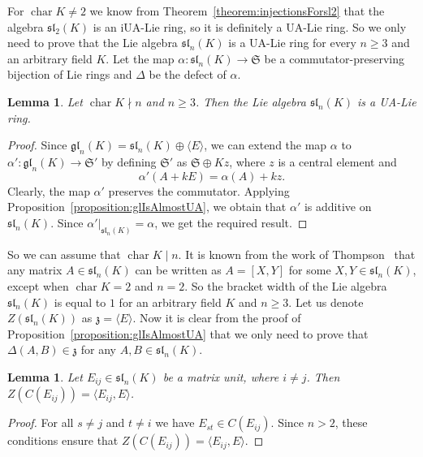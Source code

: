 \documentclass[a4paper,reqno,12pt]{amsart}
\newtheorem{lemma}[proposition]{Lemma}
\theoremstyle{definition}
\theoremstyle{remark}
\DeclareMathOperator{\Char}{char}
\def\SSS{\mathfrak{S}}
\def\zzz{\mathfrak{z}}
\def\gl{\mathfrak{gl}}
\def\sl{\mathfrak{sl}}
\renewcommand{\ge}{\geqslant}
\begin{document}
	For $\Char K \neq 2$ we know from Theorem~\ref{theorem:injectionsForsl2} that the algebra $\sl_2(K)$ is an iUA-Lie ring, so it is definitely a UA-Lie ring. So we only need to prove that the Lie algebra $\sl_n(K)$ is a UA-Lie ring for every $n \ge 3$ and an arbitrary field $K$. Let the map $\alpha : \sl_n(K) \rightarrow \SSS$ be a commutator-preserving bijection of Lie rings and $\Delta$ be the defect of $\alpha$.

	\begin{lemma}\label{lemma:slIsUAwhenCharNDevideN}
		Let $\Char K \nmid n$ and $n \ge 3$. Then the Lie algebra $\sl_n(K)$ is a UA-Lie ring.
	\end{lemma}

	\begin{proof}
		Since $\gl_n(K) = \sl_n(K) \oplus \langle E \rangle$, we can extend the map $\alpha$ to $\alpha' : \gl_n(K) \rightarrow \SSS'$ by defining $\SSS'$ as $\SSS \oplus Kz$, where $z$ is a central element and
		\begin{equation*}
			\alpha'(A + kE) = \alpha(A) + kz.
		\end{equation*}
		Clearly, the map $\alpha'$ preserves the commutator. Applying Proposition~\ref{proposition:glIsAlmostUA}, we obtain that $\alpha'$ is additive on $\sl_n(K)$. Since $\alpha'|_{\sl_n(K)} = \alpha$, we get the required result.
	\end{proof}

	So we can assume that $\Char K \mid n$. It is known from the work of Thompson~\cite{Thompson1966} that any matrix $A \in \sl_n(K)$ can be written as $A = [X, Y]$ for some $X, Y \in \sl_n(K)$, except when $\Char K = 2$ and $n = 2$. So the bracket width of the Lie algebra $\sl_n(K)$ is equal to $1$ for an arbitrary field $K$ and $n \ge 3$. Let us denote $Z(\sl_n(K))$ as $\zzz = \langle E \rangle$. Now it is clear from the proof of Proposition~\ref{proposition:glIsAlmostUA} that we only need to prove that $\Delta(A, B) \in \zzz$ for any $A, B \in \sl_n(K)$.
	
	\begin{lemma}
		Let $E_{ij} \in \sl_n(K)$ be a matrix unit, where $i \neq j$. Then $Z(C(E_{ij})) = \langle E_{ij}, E \rangle$.
	\end{lemma}

	\begin{proof}
		For all $s \neq j$ and $t \neq i$ we have $E_{st} \in C(E_{ij})$. Since $n > 2$, these conditions ensure that $Z(C(E_{ij})) = \langle E_{ij}, E \rangle$. 
	\end{proof}
	
\end{document}
